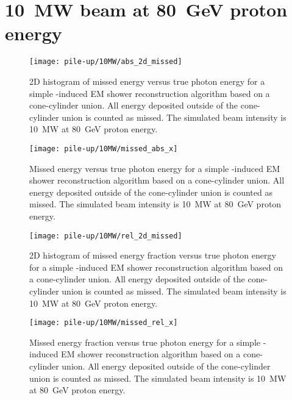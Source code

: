 \clearpage

\section{\SI{10}{\mega\watt} beam at \SI{80}{\giga\electronvolt} proton energy}

\begin{figure}[htb]
	\centering
	\texttt{[image: pile-up/10MW/abs\_2d\_missed]}
	\caption{2D histogram of missed energy versus true photon energy for a simple \Pgpz-induced EM shower reconstruction algorithm based on a cone-cylinder union.
		All energy deposited outside of the cone-cylinder union is counted as missed.
		The simulated beam intensity is \SI{10}{\mega\watt} at \SI{80}{\giga\electronvolt} proton energy.}
\end{figure}

\begin{figure}[htb]
	\centering
	\texttt{[image: pile-up/10MW/missed\_abs\_x]}
	\caption{Missed energy versus true photon energy for a simple \Pgpz-induced EM shower reconstruction algorithm based on a cone-cylinder union.
		All energy deposited outside of the cone-cylinder union is counted as missed.
		The simulated beam intensity is \SI{10}{\mega\watt} at \SI{80}{\giga\electronvolt} proton energy.}
\end{figure}

\begin{figure}[htb]
	\centering
	\texttt{[image: pile-up/10MW/rel\_2d\_missed]}
	\caption{2D histogram of missed energy fraction versus true photon energy for a simple \Pgpz-induced EM shower reconstruction algorithm based on a cone-cylinder union.
		All energy deposited outside of the cone-cylinder union is counted as missed.
		The simulated beam intensity is \SI{10}{\mega\watt} at \SI{80}{\giga\electronvolt} proton energy.}
\end{figure}

\begin{figure}[htb]
	\centering
	\texttt{[image: pile-up/10MW/missed\_rel\_x]}
	\caption{Missed energy fraction versus true photon energy for a simple \Pgpz-induced EM shower reconstruction algorithm based on a cone-cylinder union.
		All energy deposited outside of the cone-cylinder union is counted as missed.
		The simulated beam intensity is \SI{10}{\mega\watt} at \SI{80}{\giga\electronvolt} proton energy.}
\end{figure}

